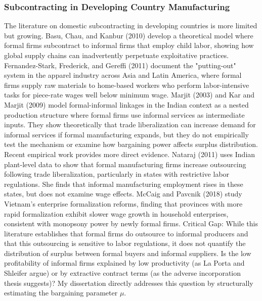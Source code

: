 \subsubsection{Subcontracting in Developing Country Manufacturing}
The literature on domestic subcontracting in developing countries is more limited but growing. Basu, Chau, and Kanbur (2010) develop a theoretical model where formal firms subcontract to informal firms that employ child labor, showing how global supply chains can inadvertently perpetuate exploitative practices. Fernandez-Stark, Frederick, and Gereffi (2011) document the "putting-out" system in the apparel industry across Asia and Latin America, where formal firms supply raw materials to home-based workers who perform labor-intensive tasks for piece-rate wages well below minimum wage.
Marjit (2003) and Kar and Marjit (2009) model formal-informal linkages in the Indian context as a nested production structure where formal firms use informal services as intermediate inputs. They show theoretically that trade liberalization can increase demand for informal services if formal manufacturing expands, but they do not empirically test the mechanism or examine how bargaining power affects surplus distribution.
Recent empirical work provides more direct evidence. Nataraj (2011) uses Indian plant-level data to show that formal manufacturing firms increase outsourcing following trade liberalization, particularly in states with restrictive labor regulations. She finds that informal manufacturing employment rises in these states, but does not examine wage effects. McCaig and Pavcnik (2018) study Vietnam's enterprise formalization reforms, finding that provinces with more rapid formalization exhibit slower wage growth in household enterprises, consistent with monopsony power by newly formal firms.
Critical Gap: While this literature establishes that formal firms do outsource to informal producers and that this outsourcing is sensitive to labor regulations, it does not quantify the distribution of surplus between formal buyers and informal suppliers. Is the low profitability of informal firms explained by low productivity (as La Porta and Shleifer argue) or by extractive contract terms (as the adverse incorporation thesis suggests)? My dissertation directly addresses this question by structurally estimating the bargaining parameter $\mu$.
